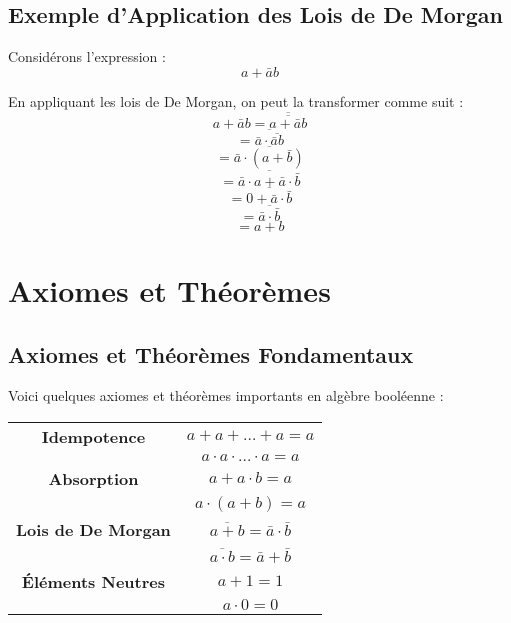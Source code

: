 \documentclass[10pt,a4paper]{article}
\begin{document}
\subsection*{Exemple d'Application des Lois de De Morgan}

Considérons l'expression :
\[ a + \bar{a}b \]

En appliquant les lois de De Morgan, on peut la transformer comme suit :
\[ a + \bar{a}b = \overline{\overline{a + \bar{a}b}} \]
\[ = \overline{\bar{a} \cdot \overline{\bar{a}b}} \]
\[ = \overline{\bar{a} \cdot (a + \bar{b})} \]
\[ = \overline{\bar{a} \cdot a + \bar{a} \cdot \bar{b}} \]
\[ = \overline{0 + \bar{a} \cdot \bar{b}} \]
\[ = \overline{\bar{a} \cdot \bar{b}} \]
\[ = a+b \]


\section*{Axiomes et Théorèmes}

\subsection*{Axiomes et Théorèmes Fondamentaux}

Voici quelques axiomes et théorèmes importants en algèbre booléenne :

\begin{center}
    \begin{tabular}{|c|c|}
    \hline
    \textbf{Idempotence} & \( a + a + \ldots + a = a \) \\ & \( a \cdot a \cdot \ldots \cdot a = a \) \\
    \hline
    \textbf{Absorption} & \( a + a \cdot b = a \) \\ & \( a \cdot (a + b) = a \) \\
    \hline
    \textbf{Lois de De Morgan} & \( \overline{a + b} = \bar{a} \cdot \bar{b} \) \\ & \( \overline{a \cdot b} = \bar{a} + \bar{b} \) \\
    \hline
    \textbf{Éléments Neutres} & \( a + 1 = 1 \) \\ & \( a \cdot 0 = 0 \) \\
    \hline
    \end{tabular}
\end{center}
\end{document}

